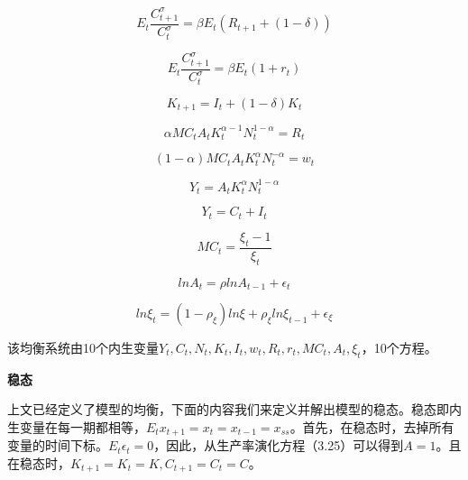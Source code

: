 \documentclass[cn,10pt,math=newtx,citestyle=gb7714-2015,bibstyle=gb7714-2015]{elegantbook}
\begin{document}
	\begin{equation}\label{label}
		E_t\frac{C_{t+1}^{\sigma}}{C_t^{\sigma}}=\beta E_t(R_{t+1}+(1-\delta))
	\end{equation}
	
	\begin{equation}\label{label}
		E_t\frac{C_{t+1}^{\sigma}}{C_t^{\sigma}}=\beta E_t(1+r_t)
	\end{equation}
	
	\begin{equation}\label{label}
		K_{t+1}=I_t+(1-\delta)K_t
	\end{equation}
	
	\begin{equation}\label{label}
		\alpha MC_t A_tK_t^{\alpha-1}N_t^{1-\alpha}=R_t
	\end{equation}
	
	\begin{equation}\label{label}
		(1-\alpha)MC_t A_tK_t^{\alpha}N_t^{-\alpha}=w_t
	\end{equation}
	
	\begin{equation}\label{label}
		Y_t=A_tK_t^{\alpha}N_t^{1-\alpha}
	\end{equation}
	
	\begin{equation}\label{label}
		Y_t=C_t+I_t
	\end{equation}
	
	\begin{equation}\label{label}
		MC_t=\frac{\xi_t-1}{\xi_t}
	\end{equation}
	
	\begin{equation}\label{label}
		lnA_t=\rho lnA_{t-1}+\epsilon_t
	\end{equation}
	
	\begin{equation}\label{label}
		ln\xi _t=(1-\rho_{\xi})ln\xi+\rho_{\xi} ln\xi_{t-1}+\epsilon_{\xi}
	\end{equation}
	
	该均衡系统由10个内生变量$Y_t,C_t,N_t,K_t,I_t,w_t,R_t,r_t,MC_t,A_t,\xi_t$，10个方程。
	
	\textbf{稳态}
	
	上文已经定义了模型的均衡，下面的内容我们来定义并解出模型的稳态。稳态即内生变量在每一期都相等，$E_tx_{t+1}=x_t=x_{t-1}=x_{ss}$。首先，在稳态时，去掉所有变量的时间下标。$E_t\epsilon_t=0$，因此，从生产率演化方程（3.25）可以得到$A=1$。且在稳态时，$K_{t+1}=K_t=K,C_{t+1}=C_t=C$。
	
\end{document}
